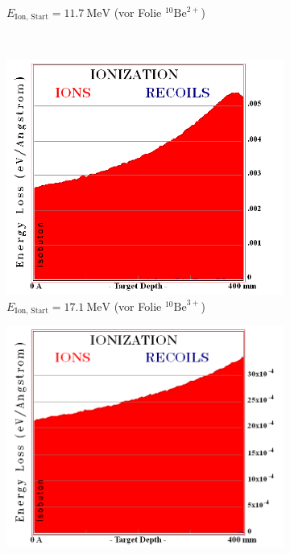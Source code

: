 \begin{figure}[h]
\begin{subfigure}{0.45\textwidth}
        \caption{$E_{\text{Ion, Start}} = \SI{11.7}{\mega\electronvolt}$ (vor Folie $^{10}\text{Be}^{2+}$)}
        \label{Auswertung_Gasdetektor_TRIM_sims_b}
    \end{subfigure} \\
    \begin{subfigure}{0.45\textwidth}
        \centering
        \includegraphics[width=0.95\linewidth]{Pictures/TRIM_Ionisierung_10Be_in_Isobutan_vorher_3+.png}
        \caption{$E_{\text{Ion, Start}} = \SI{17.1}{\mega\electronvolt}$ (vor Folie $^{10}\text{Be}^{3+}$)}
        \label{Auswertung_Gasdetektor_TRIM_sims_c}
    \end{subfigure} \qquad
    \begin{subfigure}{0.45\textwidth}
        \centering
        \includegraphics[width=0.95\linewidth]{Pictures/TRIM_Ionisierung_10Be_in_Isobutan_vorher_4+.png}

\end{subfigure}
\end{figure}
